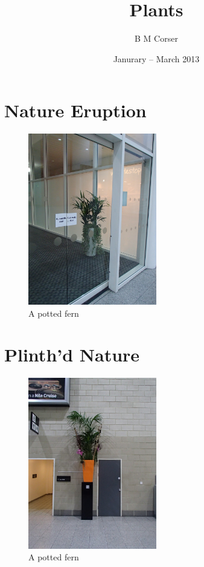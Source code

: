 \documentclass{book}
\title{Plants}
\author{B M Corser}
\date{Janurary -- March 2013}
\begin{document}
    \maketitle
    \tableofcontents
    \chapter{Nature Eruption}
        \begin{figure}
            \centering
            \includegraphics[width=0.5\textwidth]{figures/P1050140.JPG}
            \caption{\label{fig:pottedfern}A potted fern}
        \end{figure}
    \chapter{Plinth'd Nature}
        \begin{figure}
            \centering
            \includegraphics[width=0.5\textwidth]{figures/P1050143.JPG}
            \caption{\label{fig:pottedfern}A potted fern}
        \end{figure}
\end{document}
